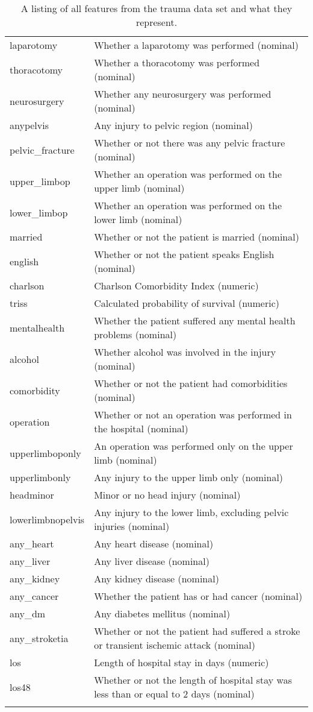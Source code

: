 \begin{longtable}{lp{13cm}}
laparotomy & Whether a laparotomy was performed (nominal) \\ 
thoracotomy & Whether a thoracotomy was performed (nominal) \\ 
neurosurgery & Whether any neurosurgery was performed (nominal) \\ 
anypelvis & Any injury to pelvic region (nominal) \\ 
pelvic\_fracture & Whether or not there was any pelvic fracture (nominal) \\ 
upper\_limbop & Whether an operation was performed on the upper limb (nominal) \\ 
lower\_limbop & Whether an operation was performed on the lower limb (nominal) \\ 
married & Whether or not the patient is married (nominal) \\ 
english & Whether or not the patient speaks English (nominal) \\ 
charlson & Charlson Comorbidity Index (numeric) \\ 
triss & Calculated probability of survival (numeric) \\ 
mentalhealth & Whether the patient suffered any mental health problems (nominal) \\ 
alcohol & Whether alcohol was involved in the injury (nominal) \\ 
comorbidity & Whether or not the patient had comorbidities (nominal) \\ 
operation & Whether or not an operation was performed in the hospital (nominal) \\ 
upperlimboponly & An operation was performed only on the upper limb (nominal) \\ 
upperlimbonly & Any injury to the upper limb only (nominal) \\ 
headminor & Minor or no head injury (nominal) \\ 
lowerlimbnopelvis & Any injury to the lower limb, excluding pelvic injuries (nominal) \\ 
any\_heart & Any heart disease (nominal) \\ 
any\_liver & Any liver disease (nominal) \\ 
any\_kidney & Any kidney disease (nominal) \\ 
any\_cancer & Whether the patient has or had cancer (nominal) \\ 
any\_dm & Any diabetes mellitus (nominal) \\ 
any\_stroketia & Whether or not the patient had suffered a stroke or transient ischemic attack (nominal) \\ 
los & Length of hospital stay in days (numeric) \\ 
los48 & Whether or not the length of hospital stay was less than or equal to 2 days (nominal) \\ 
\caption{A listing of all features from the trauma data set and what they represent.}
\label{tab:feature-desc-tr}
\end{longtable}
\renewcommand{\arraystretch}{1}


